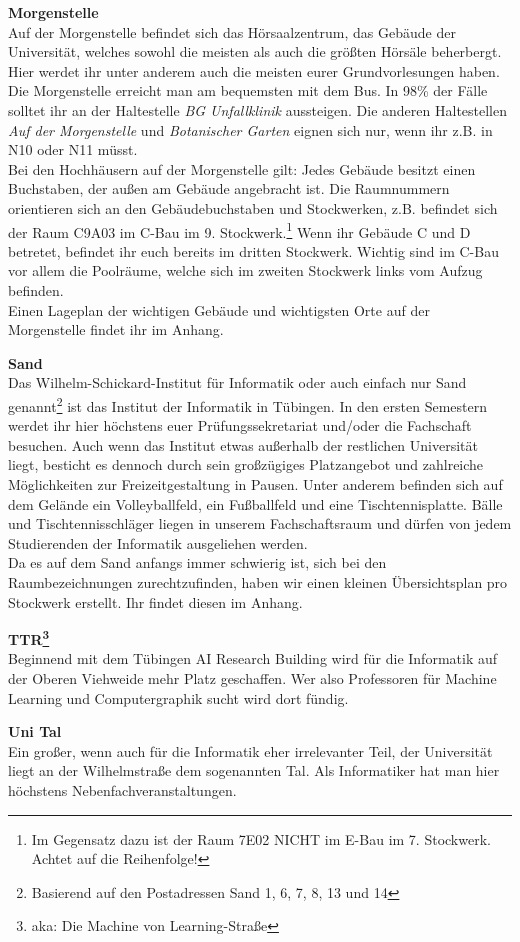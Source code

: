 \textbf{Morgenstelle}\\
Auf der Morgenstelle befindet sich das Hörsaalzentrum, das Gebäude der Universität, welches sowohl die meisten als auch die größten Hörsäle beherbergt. Hier werdet ihr unter anderem auch die meisten eurer Grundvorlesungen haben.\\
Die Morgenstelle erreicht man am bequemsten mit dem Bus. In 98\% der Fälle solltet ihr an der Haltestelle \emph{BG Unfallklinik} aussteigen. Die anderen Haltestellen \emph{Auf der Morgenstelle} und \emph{Botanischer Garten} eignen sich nur, wenn ihr z.B. in N10 oder N11 müsst.\\ Bei den Hochhäusern auf der Morgenstelle gilt: Jedes Gebäude besitzt einen Buchstaben, der außen am Gebäude angebracht ist.  Die Raumnummern orientieren sich an den Gebäudebuchstaben und Stockwerken, z.B. befindet sich der Raum C9A03 im C-Bau im 9. Stockwerk.\footnote{Im Gegensatz dazu ist der Raum 7E02 NICHT im E-Bau im 7. Stockwerk. Achtet auf die Reihenfolge!} Wenn ihr Gebäude C und D betretet, befindet ihr euch bereits im dritten Stockwerk. Wichtig sind im C-Bau vor allem die Poolräume, welche sich im zweiten Stockwerk links vom Aufzug befinden. \\
Einen Lageplan der wichtigen Gebäude und wichtigsten Orte auf der Morgenstelle findet ihr im Anhang.

\textbf{Sand}\\
Das Wilhelm-Schickard-Institut für Informatik oder auch einfach nur Sand genannt\footnote{Basierend auf den Postadressen Sand 1, 6, 7, 8, 13 und 14} ist das Institut der Informatik in Tübingen. In den ersten Semestern werdet ihr hier höchstens euer Prüfungssekretariat und/oder die Fachschaft besuchen. Auch wenn das Institut etwas außerhalb der restlichen Universität liegt, besticht es dennoch durch sein großzügiges Platzangebot und zahlreiche Möglichkeiten zur Freizeitgestaltung in Pausen. Unter anderem befinden sich auf dem Gelände ein Volleyballfeld, ein Fußballfeld und eine Tischtennisplatte. Bälle und Tischtennisschläger liegen in unserem Fachschaftsraum und dürfen von jedem Studierenden der Informatik ausgeliehen werden.\\
Da es auf dem Sand anfangs immer schwierig ist, sich bei den Raumbezeichnungen zurechtzufinden, haben wir einen kleinen Übersichtsplan pro Stockwerk erstellt. Ihr findet diesen im Anhang.

\textbf{TTR\footnote{aka: Die Machine von Learning-Straße}}\\
Beginnend mit dem Tübingen AI Research Building wird für die Informatik auf der Oberen Viehweide mehr Platz geschaffen. Wer also Professoren für Machine Learning und Computergraphik sucht wird dort fündig.

\textbf{Uni Tal}\\
Ein großer, wenn auch für die Informatik eher irrelevanter Teil, der Universität liegt an der Wilhelmstraße dem sogenannten Tal. Als Informatiker hat man hier höchstens Nebenfachveranstaltungen.
\vfill 